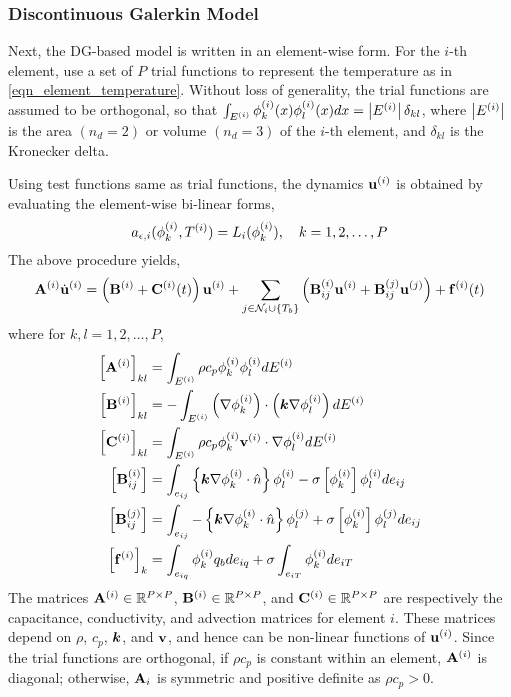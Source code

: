 \subsubsection{Discontinuous Galerkin Model}

Next, the DG-based model is written in an element-wise form. For the $i$-th element, use a set of $P$ trial functions to represent the temperature as in \cref{eqn_element_temperature}. Without loss of generality, the trial functions are assumed to be orthogonal, so that $\int_{E^{(i)}} \phi^{(i)}_k(x) \phi^{(i)}_l(x) dx = \left|E^{(i)}\right|\delta_{kl}$, where $\left|E^{(i)}\right|$ is the area $(n_d=2)$ or volume $(n_d=3)$ of the $i$-th element, and $\delta_{kl}$ is the Kronecker delta.

Using test functions same as trial functions, the dynamics $\mathbf{u}^{(i)}$ is obtained by evaluating the element-wise bi-linear forms,
\begin{equation}
    a_{\epsilon,i}(\phi_k^{(i)},T^{(i)}) = L_i(\phi_k^{(i)}),\quad k=1,2,\dots,P
\end{equation}
The above procedure yields,
\begin{equation}
    \mathbf{A}^{(i)}\dot{\mathbf{u}}^{(i)} = \left(\mathbf{B}^{(i)} + \mathbf{C}^{(i)}(t)\right)\mathbf{u}^{(i)} + \sum_{j\in\mathcal{N}_i\cup\left\{T_b\right\}}\left(\mathbf{B}^{(i)}_{ij}\mathbf{u}^{(i)} + \mathbf{B}^{(j)}_{ij}\mathbf{u}^{(j)}\right) + \mathbf{f}^{(i)}(t)\label{eqn_element_wise_model}
\end{equation}
where for $k,l=1,2,\dots,P$,
\begin{subequations}
    \begin{align}
        \left[\mathbf{A}^{(i)}\right]_{kl} &= \int_{E^{(i)}}\rho c_p\phi_k^{(i)}\phi_l^{(i)}dE^{(i)}\\
        \left[\mathbf{B}^{(i)}\right]_{kl} &= -\int_{E^{(i)}}\left(\nabla\phi_k^{(i)}\right)\cdot\left(\boldsymbol{k}\nabla\phi_l^{(i)}\right)dE^{(i)}\\
        \left[\mathbf{C}^{(i)}\right]_{kl} &= \int_{E^{(i)}}\rho c_p \phi_k^{(i)}\mathbf{v}^{(i)}\cdot\nabla\phi_l^{(i)}dE^{(i)}\label{eqn_advection_matrix_element_kl}\\
        \left[\mathbf{B}^{(i)}_{ij}\right] &= \int_{e_{ij}}\left\{\boldsymbol{k}\nabla\phi_k^{(i)}\cdot\hat{n}\right\}\phi_l^{(i)} - \sigma\left[\phi_k^{(i)}\right]\phi_l^{(i)}de_{ij}\\
        \left[\mathbf{B}^{(j)}_{ij}\right] &= \int_{e_{ij}}-\left\{\boldsymbol{k}\nabla\phi_k^{(i)}\cdot\hat{n}\right\}\phi_l^{(j)} + \sigma\left[\phi_k^{(i)}\right]\phi_l^{(j)}de_{ij}\\
        \left[\mathbf{f}^{(i)}\right]_k &= \int_{e_{iq}}\phi_k^{(i)}q_bde_{iq} + \sigma\int_{e_{iT}}\phi_k^{(i)}de_{iT}
    \end{align}
\end{subequations}
The matrices $\mathbf{A}^{(i)}\in\mathbb{R}^{P\times P}$, $\mathbf{B}^{(i)}\in\mathbb{R}^{P\times P}$, and $\mathbf{C}^{(i)}\in\mathbb{R}^{P\times P}$ are respectively the capacitance, conductivity, and advection matrices for element $i$. These matrices depend on $\rho$, $c_p$, $\boldsymbol{k}$, and $\mathbf{v}$, and hence can be non-linear functions of $\mathbf{u}^{(i)}$. Since the trial functions are orthogonal, if $\rho c_p$ is constant within an element, $\mathbf{A}^{(i)}$ is diagonal; otherwise, $\mathbf{A}_i$ is symmetric and positive definite as $\rho c_p > 0$.


